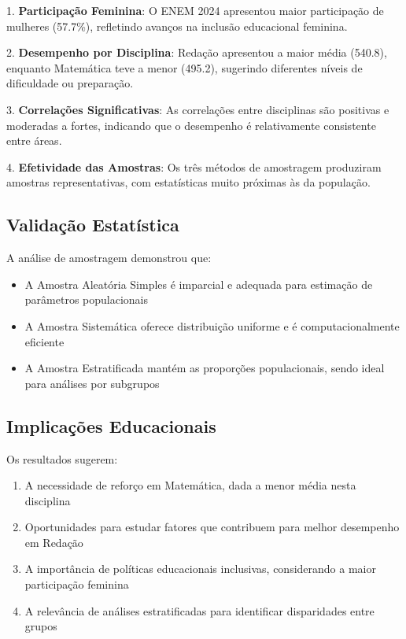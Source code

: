 \documentclass[12pt,a4paper]{article}
\begin{document}
1. \textbf{Participação Feminina}: O ENEM 2024 apresentou maior participação de mulheres (57.7\%), refletindo avanços na inclusão educacional feminina.

2. \textbf{Desempenho por Disciplina}: Redação apresentou a maior média (540.8), enquanto Matemática teve a menor (495.2), sugerindo diferentes níveis de dificuldade ou preparação.

3. \textbf{Correlações Significativas}: As correlações entre disciplinas são positivas e moderadas a fortes, indicando que o desempenho é relativamente consistente entre áreas.

4. \textbf{Efetividade das Amostras}: Os três métodos de amostragem produziram amostras representativas, com estatísticas muito próximas às da população.

\subsection{Validação Estatística}

A análise de amostragem demonstrou que:

\begin{itemize}
    \item A Amostra Aleatória Simples é imparcial e adequada para estimação de parâmetros populacionais
    \item A Amostra Sistemática oferece distribuição uniforme e é computacionalmente eficiente
    \item A Amostra Estratificada mantém as proporções populacionais, sendo ideal para análises por subgrupos
\end{itemize}

\subsection{Implicações Educacionais}

Os resultados sugerem:

\begin{enumerate}
    \item A necessidade de reforço em Matemática, dada a menor média nesta disciplina
    \item Oportunidades para estudar fatores que contribuem para melhor desempenho em Redação
    \item A importância de políticas educacionais inclusivas, considerando a maior participação feminina
    \item A relevância de análises estratificadas para identificar disparidades entre grupos
\end{enumerate}
\end{document}
